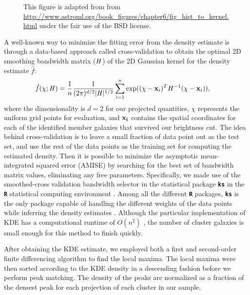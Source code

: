 \begin{figure*}
	\caption{This figure is adapted from \citealt{Vanderplas2012} from
\href{http://www.astroml.org/book\_figures/chapter6/fig\_hist\_to\_kernel.html}{http://www.astroml.org/book\_figures/chapter6/fig\_hist\_to\_kernel.html}
under the fair use of the BSD license. \label{fig:bias_variance_tradeoff}
}
\end{figure*}
A well-known way to minimize the fitting error from the density estimate is through
a data-based approach called cross-validation to obtain 
the optimal 2D smoothing
bandwidth matrix ($\mathbf{\it H}$) of the 2D Gaussian kernel for the
density estimate $\hat{f}$:
\begin{align}
	\hat{f}(\chi; \mathbf{\it H}) &= \frac{1}{n} \frac{1}{(2\pi)^{d/2}|\mathbf{\it H}|^{1/2}}
	\sum_{i=1}^n \exp((\chi-{\bf x}_i)^T H^{-1} (\chi-{\bf x}_i)),
	\label{eq:cross_validated_bandwidth}
\end{align}
where the dimensionality is $d=2$ for our projected quantities,
$\chi$ represents the uniform grid points for evaluation, and 
$\bf{x}_i$ contains the spatial coordinates for each of the identified member 
galaxies that survived our brightness cut.
The idea behind cross-validation is to leave a small fraction of data point 
out as the test set, and use the rest of the data points as 
the training set for computing the estimated density.
Then it is possible to minimize the asymptotic mean-integrated squared error
(AMISE)  by searching
for the best set of bandwidth matrix values, eliminating any free parameters. 
Specifically, we made use of the smoothed-cross validation \citep{Hall1992} 
bandwidth selector in the statistical package {\bf \texttt{ks}} \citep{Duong2007} 
in the {\bf \texttt{R}} statistical computing environment \citep{R_core}. 
Among all the different {\bf \texttt{R}} packages, {\bf \texttt{ks}} is the
only package capable of handling the different weights of the data points 
while inferring the density estimates \citep{Deng2011}. 
Although the particular implementation of KDE has a computational runtime of $O(n^2)$ 
, the number of cluster galaxies is
small enough for this method to finish quickly. 

After obtaining the KDE estimate, we employed both a first and second-order  
finite differencing algorithm to find the local maxima.  
The local maxima were then sorted according to the KDE density in a descending
fashion before we perform peak matching. The density
of the peaks are normalized as a fraction of the densest peak for each
projection of each cluster in our sample. 


